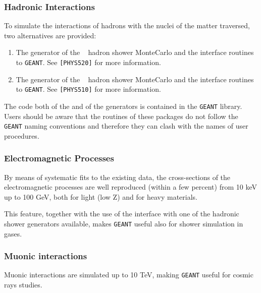 \subsubsection{Hadronic Interactions}

To simulate the interactions of hadrons with the nuclei of the matter 
traversed, two alternatives are provided:
\begin{enumerate}
\item The generator of the ~\cite{bib-FLUK,bib-FLU1}
hadron shower MonteCarlo and the
interface routines to {\tt GEANT}. See {\tt [PHYS520]} for more information.
\item The generator of the ~\cite{bib-GHEI}
hadron shower MonteCarlo and the
interface routines to {\tt GEANT}. See {\tt [PHYS510]} for more information.
\end{enumerate}
 
The code both of the  and of the  generators is
contained in the {\tt GEANT} library. Users should be aware that the
routines of these packages do not follow the {\tt GEANT} naming conventions
and therefore they can clash with the names of user procedures.
 
\subsubsection{Electromagnetic Processes}
By means of systematic fits to the existing
data, the cross-sections of the electromagnetic processes are well reproduced
(within a few percent) from 10 keV up to 100 GeV, both for light (low Z) and
for heavy materials.
 
This feature, together with the use of the interface with one of the
hadronic shower generators available,
makes {\tt GEANT} useful also for shower simulation in gases.
 
\subsubsection{Muonic interactions}
Muonic interactions are simulated up to 10 TeV, making
{\tt GEANT} useful for cosmic rays studies.
 
